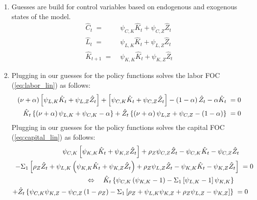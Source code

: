 \documentclass[a4paper, 12pt]{article}
\begin{document}
\begin{Answer}%
	\begin{small}%
		\begin{enumerate}%
			\item[a) ] Guesses are build for control variables based on endogenous and exogenous states of the model.%
				\begin{align*}%
					\hat{C}_t \; = & \; \psi_{C,K} \hat{K}_t + \psi_{C,Z} \hat{Z}_t\\%
					\hat{L}_t \; = & \; \psi_{L,K} \hat{K}_t + \psi_{L,Z} \hat{Z}_t\\%
					\hat{K}_{t+1} \; = & \; \psi_{K,K} \hat{K}_t + \psi_{K,Z} \hat{Z}_t%
				\end{align*}%
			\item[b) ] Plugging in our guesses for the policy functions solves the labor FOC (\ref{eq:labor_lin}) as follows:%
				\begin{align}%
					\left(\nu+\alpha\right) \left[ \psi_{L,K} \hat{K}_t + \psi_{L,Z} \hat{Z}_t \right] + \left[ \psi_{C,K} \hat{K}_t + \psi_{C,Z} \hat{Z}_t \right] - \left(1-\alpha\right) \hat{Z}_t - \alpha \hat{K}_t \; = & \; 0\notag\\%
					\hat{K}_t \left\{ \left(\nu+\alpha\right) \psi_{L,K} + \psi_{C,K} - \alpha \right\} + \hat{Z}_t \left\{ \left(\nu+\alpha\right) \psi_{L,Z} + \psi_{C,Z} - \left(1-\alpha\right) \right\} \; = & \; 0\label{eq:labor_policy_1}%
				\end{align}%
				Plugging in our guesses for the policy functions solves the capital FOC (\ref{eq:capital_lin}) as follows:%
				\begin{align}%
					\psi_{C,K} \left[ \psi_{K,K} \hat{K}_t + \psi_{K,Z} \hat{Z}_t \right] + \rho_Z \psi_{C,Z} \hat{Z}_t - \psi_{C,K} \hat{K}_t - \psi_{C,Z} \hat{Z}_t \; \quad &\notag\\%
					- \Sigma_1 \left[ \rho_Z \hat{Z}_t + \psi_{L,K} \left( \psi_{K,K} \hat{K}_t + \psi_{K,Z} \hat{Z}_t \right) + \rho_Z \psi_{L,Z} \hat{Z}_t - \psi_{K,K} \hat{K}_t - \psi_{K,Z} \hat{Z}_t \right] \; = & \; 0\notag\\%
					\begin{split}%
						\Leftrightarrow \quad \hat{K}_t \left\{ \psi_{C,K} \left(\psi_{K,K}-1\right) - \Sigma_1 \left[\psi_{L,K}-1\right] \psi_{K,K} \right\} \; \quad &\\%
						+ \hat{Z}_t \left\{ \psi_{C,K}\psi_{K,Z} - \psi_{C,Z} \left(1-\rho_Z\right) - \Sigma_1 \left[ \rho_Z + \psi_{L,K} \psi_{K,Z} + \rho_Z \psi_{L,Z} - \psi_{K,Z} \right] \right\} \; = & \; 0%
					\end{split}\label{eq:capital_policy_1}%

\end{align}
\end{enumerate}
\end{small}
\end{Answer}
\end{document}
